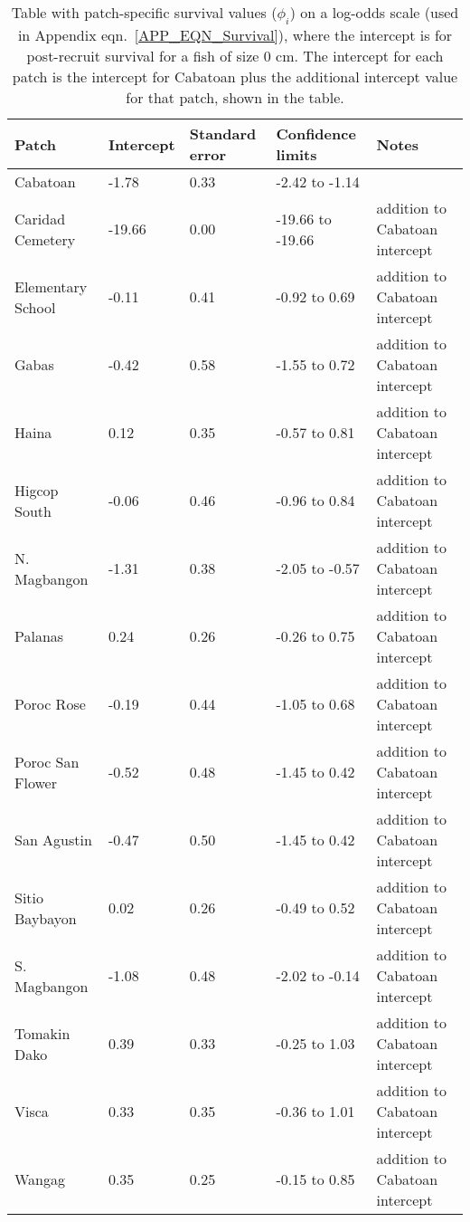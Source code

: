 \documentclass[12pt, oneside]{article}   	%
\begin{document}
\begin{table}[!htbp] 
\begin{centering}
\caption{Table with patch-specific survival values ($\phi_i$) on a log-odds scale (used in Appendix eqn.\ \ref{APP_EQN_Survival}), where the intercept is for post-recruit survival for a fish of size 0 cm. The intercept for each patch is the intercept for Cabatoan plus the additional intercept value for that patch, shown in the table.} \label{APP_TAB_SiteSurvivals}
\begin{tabular}{|p{1.1in}|p{0.75in}|p{0.75in}|p{1.25in}|p{1.5in}|}
\hline 
\textbf{Patch} & \textbf{Intercept} & \textbf{Standard error} & \textbf{Confidence limits} & \textbf{Notes} \\ \hline
Cabatoan & -1.78 & 0.33 & -2.42 to -1.14 & \\ \hline
Caridad Cemetery & -19.66 & 0.00 & -19.66 to -19.66 & addition to Cabatoan intercept \\ \hline
Elementary School & -0.11 & 0.41 & -0.92 to 0.69 & addition to Cabatoan intercept \\ \hline
Gabas & -0.42 & 0.58 & -1.55 to 0.72 & addition to Cabatoan intercept \\ \hline
Haina & 0.12 & 0.35 & -0.57 to 0.81 & addition to Cabatoan intercept \\ \hline
Higcop South & -0.06 & 0.46 & -0.96 to 0.84 & addition to Cabatoan intercept \\ \hline
N. Magbangon & -1.31 & 0.38 & -2.05 to -0.57 & addition to Cabatoan intercept \\ \hline
Palanas & 0.24 & 0.26 & -0.26 to 0.75 & addition to Cabatoan intercept \\ \hline
Poroc Rose & -0.19 & 0.44 & -1.05 to 0.68 & addition to Cabatoan intercept \\ \hline
Poroc San Flower & -0.52 & 0.48 & -1.45 to 0.42 & addition to Cabatoan intercept \\ \hline
San Agustin & -0.47 & 0.50 & -1.45 to 0.42 & addition to Cabatoan intercept \\ \hline
Sitio Baybayon & 0.02 & 0.26 & -0.49 to 0.52 & addition to Cabatoan intercept \\ \hline
S. Magbangon & -1.08 & 0.48 & -2.02 to -0.14 & addition to Cabatoan intercept \\ \hline
Tomakin Dako & 0.39 & 0.33 & -0.25 to 1.03 & addition to Cabatoan intercept \\ \hline
Visca & 0.33 & 0.35 & -0.36 to 1.01 & addition to Cabatoan intercept \\ \hline
Wangag & 0.35 & 0.25 & -0.15 to 0.85 & addition to Cabatoan intercept \\ \hline
\end{tabular}
\end{centering}
\end{table}
\end{document}
